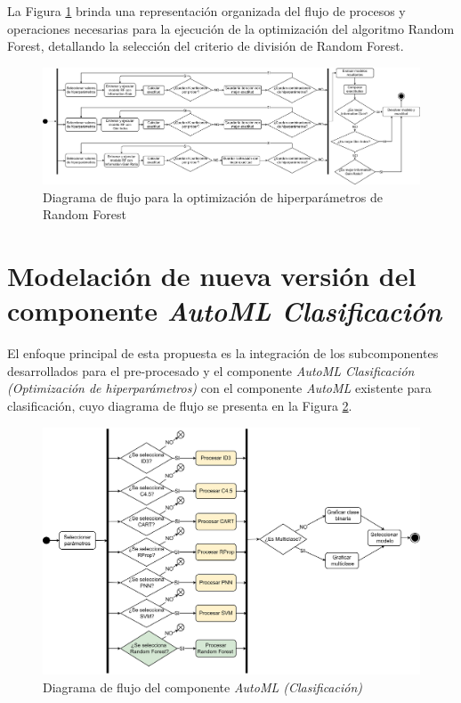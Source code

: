 La Figura \ref{fig:optimizacion-randomforest} brinda una representación organizada del flujo de procesos y operaciones necesarias para la ejecución de la optimización del algoritmo Random Forest, detallando la selección del criterio de división de Random Forest.


\begin{figure}[H]
	\centering
	\includegraphics[width=1\linewidth]{"figuras/capi 2/hpo/Optimizacion RandomForest"}
	\caption{Diagrama de flujo para la optimización de hiperparámetros de Random Forest}
	\label{fig:optimizacion-randomforest}
\end{figure}


\section{Modelación de nueva versión del componente \textit{AutoML Clasificación}}
El enfoque principal de esta propuesta es la integración de los subcomponentes desarrollados para el pre-procesado y el componente \textit{AutoML Clasificación (Optimización de hiperparámetros)} con el componente \textit{AutoML} existente para clasificación, cuyo diagrama de flujo se presenta en la Figura \ref{fig:diagrama-general-componente}. \\

\begin{figure}[H]
	\centering
	\includegraphics[width=0.9\linewidth]{"figuras/capi 2/Diagrama General Componente"}
	\caption{Diagrama de flujo del componente \textit{AutoML (Clasificación)}}
	\label{fig:diagrama-general-componente}
\end{figure}

